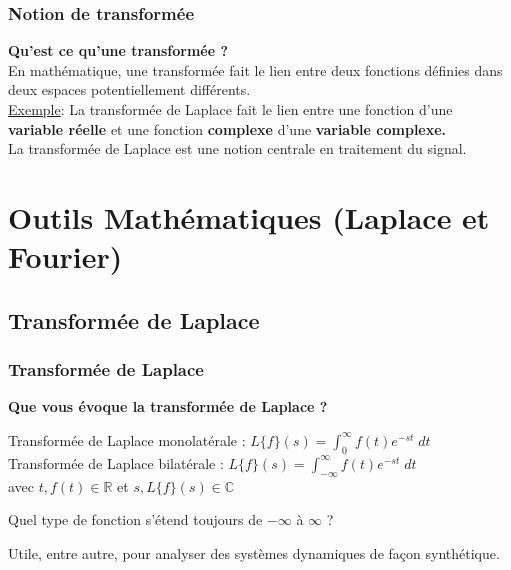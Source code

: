 \documentclass{beamer}
\begin{document}
\begin{frame} 
\frametitle{Notion de transformée}
\textbf{Qu'est ce qu'une transformée ?\\}
\vspace{0.5cm}
En mathématique, une transformée fait le lien entre deux fonctions définies dans deux espaces potentiellement différents.\\
\vspace{1cm}
\underline{Exemple}: La transformée de Laplace fait le lien entre une fonction d'une \textbf{variable réelle} et une fonction \textbf{complexe} d'une \textbf{variable complexe.}\\
\vspace{0.5cm}
La transformée de Laplace est une notion centrale en traitement du signal.
\end{frame}

\section{Outils Mathématiques (Laplace et Fourier)}
\subsection{Transformée de Laplace}

\begin{frame}
\frametitle{Transformée de Laplace}
\textbf{Que vous évoque la transformée de Laplace ?}\\

\vspace{1cm}

{
	Transformée de Laplace monolatérale : $L\{f\}(s) = \displaystyle \int^{\infty}_{0} f(t) e^{-st} \; dt$\\ 
	\vspace{0.3cm}
	Transformée de Laplace bilatérale : $L\{f\}(s) = \displaystyle \int^{\infty}_{-\infty} f(t) e^{-st} \; dt$\\
	
\vspace{0.3cm}
avec $t,f(t) \in \mathbb{R}$ et $s,L\{f\}(s) \in \mathbb{C}$\\
\vspace{0.3cm}
}

{
Quel type de fonction s'étend toujours de $-\infty$ à $\infty$ ? 
}

{
\begin{block}{}
Utile, entre autre, pour analyser des systèmes dynamiques de façon synthétique.
\end{block}
}
\end{frame} 
\end{document}
